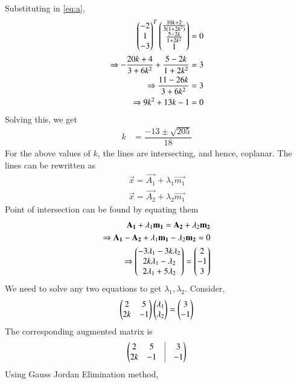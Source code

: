 \documentclass[journal,12pt,twocolumn]{IEEEtran}
\begin{document}
Substituting in \eqref{eq:a},
\begin{align}
    \begin{pmatrix}-2\\1\\-3\end{pmatrix}^{T}\begin{pmatrix}\frac{10k+2}{3(1+2k^{2})}\\\frac{5-2k}{1+2k^{2}}\\1\end{pmatrix}&=0\\
    \Rightarrow -\frac{20k+4}{3+6k^{2}}+\frac{5-2k}{1+2k^{2}}&=3\\
    \Rightarrow \frac{11-26k}{3+6k^{2}}&=3\\
    \Rightarrow 9k^2+13k-1&=0
\end{align}
Solving this, we get
\begin{align}
    k&=\dfrac{-13\pm \sqrt{205}}{18}
\end{align}
For the above values of $k$, the lines are intersecting, and hence, coplanar. The lines can be rewritten as
\begin{align}
    \vec{x}=\vec{A_{1}}+\lambda_{1}\vec{m_{1}}\label{eq:form}\\
    \vec{x}=\vec{A_{2}}+\lambda_{2}\vec{m_{1}}
\end{align}
Point of intersection can be found by equating them
\begin{align}
    \mathbf{A_{1}}+\lambda_{1}\mathbf{m_{1}}=\mathbf{A_{2}}+\lambda_{2}\mathbf{m_{2}}\\
    \Rightarrow \mathbf{A_{1}}-\mathbf{A_{2}}+\lambda_{1}\mathbf{m_{1}}-\lambda_{2}\mathbf{m_{2}}=0\\
    \Rightarrow \begin{pmatrix}-3\lambda_{1}-3k\lambda_{2}\\
    2k\lambda_{1}-\lambda_{2}\\
    2\lambda_{1}+5\lambda_{2}\end{pmatrix}=\begin{pmatrix}2\\-1\\3\end{pmatrix}
\end{align}
We need to solve any two equations to get $\lambda_{1},\lambda_{2}$. Consider,
\begin{align}
    \begin{pmatrix}2 & 5 \\ 2k & -1\end{pmatrix}\begin{pmatrix}\lambda_{1} \\ \lambda_{2}\end{pmatrix} = \begin{pmatrix}3 \\ -1\end{pmatrix}
\end{align}
The corresponding augmented matrix is 
\begin{align}
    \myvec{2 & 5 & \vrule & 3 \\
		2k & -1 & \vrule & -1 \\}
\end{align}
Using Gauss Jordan Elimination method,
\end{document}
